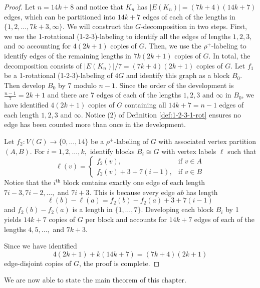 \begin{proof}
    Let $n=14k+8$ and notice that $K_n$ has $|E(K_n)|=(7k+4)(14k+7)$ edges, which can be partitioned into $14k+7$ edges of each of the lengths in $\{1,2,\dots,7k+3,\infty\}.$  We will construct the $G$-decomposition in two steps. First, we use the 1-rotational (1-2-3)-labeling to identify all the edges of lengths $1,2,3,$ and $\infty$ accounting for $4(2k+1)$ copies of $G$. Then, we use the $\rho^{+}$-labeling to identify edges of the remaining lengths in $7k(2k+1)$ copies of $G$. In total, the decomposition consists of $|E(K_n)|/7=(7k+4)(2k+1)$ copies of $G.$
    Let $f_1$ be a 1-rotational (1-2-3)-labeling of $4G$ and identify this graph as a block $B_0$. Then develop $B_0$ by 7 modulo $n-1$. Since the order of the development is $\frac{n-1}{7}=2k+1$ and there are 7 edges of each of the lengths $1,2,3$ and $\infty$ in $B_0$, we have identified $4(2k+1)$ copies of $G$ containing all $14k+7=n-1$ edges of each length $1,2,3$ and $\infty$. Notice (2) of Definition \ref{def:1-2-3-1-rot} ensures no edge has been counted more than once in the development.

    Let $f_2:V(G) \rightarrow \{0,\dots,14\}$ be a $\rho^{+}$-labeling of $G$ with associated vertex partition $(A,B).$ For $i=1,2,\dots,k,$ identify blocks $B_i \cong G$ with vertex labels $\ell$ such that
    \[
    \ell(v)=
    \begin{cases}
        f_2(v), & \textrm{if } v \in A \\
        f_2(v)+3+7(i-1), & \textrm{if } v \in B
    \end{cases}
    \]
    Notice that the $i^{\textrm{th}}$ block contains exactly one edge of each length $7i-3,7i-2, \dots,$ and $ 7i+3.$ This is because every edge $ab$ has length 
    \[
    \ell(b)-\ell(a)=f_2(b)-f_2(a)+3+7(i-1)
    \]
    and $f_2(b)-f_2(a)$ is a length in $\{1,\dots,7\}.$
    Developing each block $B_i$ by 1 yields $14k+7$ copies of $G$ per block and accounts for $14k+7$ edges of each of the lengths $4,5,\dots,$ and $7k+3$.

    Since we have identified
    \[
    4(2k+1)+k(14k+7)=(7k+4)(2k+1)
    \]
    edge-disjoint copies of $G$, the proof is complete.
\end{proof}

We are now able to state the main theorem of this chapter. 

